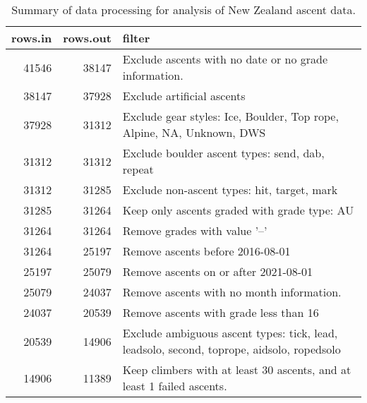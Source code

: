 \begin{table}[ht]
\centering
\begingroup\fontsize{9pt}{10pt}\selectfont
\begin{tabular}{rrl}
  \hline
{\bf rows.in} & {\bf rows.out} & {\bf filter} \\ 
  \hline
41546 & 38147 & Exclude ascents with no date or no grade information. \\ 
  38147 & 37928 & Exclude artificial ascents \\ 
  37928 & 31312 & Exclude gear styles: Ice, Boulder, Top rope, Alpine, NA, Unknown, DWS \\ 
  31312 & 31312 & Exclude boulder ascent types: send, dab, repeat \\ 
  31312 & 31285 & Exclude non-ascent types: hit, target, mark \\ 
  31285 & 31264 & Keep only ascents graded with grade type: AU \\ 
  31264 & 31264 & Remove grades with value '--' \\ 
  31264 & 25197 & Remove ascents before 2016-08-01 \\ 
  25197 & 25079 & Remove ascents on or after 2021-08-01 \\ 
  25079 & 24037 & Remove ascents with no month information. \\ 
  24037 & 20539 & Remove ascents with grade less than 16 \\ 
  20539 & 14906 & Exclude ambiguous ascent types: tick, lead, leadsolo, second, toprope, aidsolo, ropedsolo \\ 
  14906 & 11389 & Keep climbers with at least 30 ascents, and at least 1 failed ascents. \\ 
   \hline
\end{tabular}
\endgroup
\caption{Summary of data processing for analysis of New Zealand ascent data.} 
\label{table-data-processing-nz}
\end{table}
